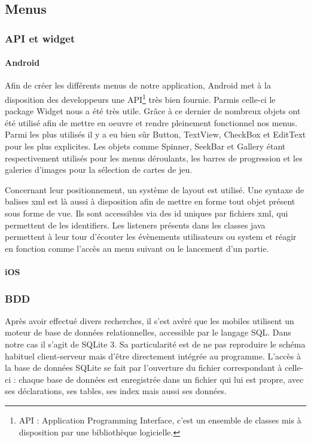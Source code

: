 \subsection{Menus}
	\subsubsection{API et widget}
	\paragraph{Android\\}
		Afin de créer les différents menus de notre application, Android met à la
		disposition des developpeurs une API\footnote{API : Application Programming
		Interface, c'est un ensemble de classes mis à disposition par une
		bibliothèque logicielle.} très bien fournie. Parmis celle-ci le package Widget
		nous a été très utile. Grâce à ce dernier de nombreux objets ont été utilisé
		afin de mettre en oeuvre et rendre pleinement fonctionnel nos menus.
		Parmi les plus utilisés il y a eu bien sûr Button, TextView, CheckBox et
		EditText pour les plus explicites. Les objets comme Spinner, SeekBar et
		Gallery étant respectivement utilisés pour les menus déroulants, les barres de
		progression et les galeries d'images pour la sélection de cartes de jeu.
		
		Concernant leur positionnement, un système de layout est utilisé. Une syntaxe
		de balises xml est là aussi à disposition afin de mettre en forme tout objet
		présent sous forme de vue. Ils sont accessibles via des id uniques par
		fichiers xml, qui permettent de les identifiers. Les listeners présents dans
		les classes java permettent à leur tour d'écouter les évènements utilisateurs
		ou system et réagir en fonction comme l'accès au menu suivant ou le lancement
		d'un partie.
	\paragraph{iOS\\}
		
	\subsubsection{BDD}

		Après avoir effectué divers recherches, il s'est avéré que les mobiles
		utilisent un moteur de base de données relationnelles, accessible par le
		langage SQL. Dans notre cas il s'agit de SQLite 3. Sa particularité est de ne
		pas reproduire le schéma habituel client-serveur mais d'être directement intégrée au programme.
		L'accès à la base de données SQLite se fait par l'ouverture du fichier
		correspondant à celle-ci : chaque base de données est enregistrée dans un fichier qui lui est propre,
		 avec ses déclarations, ses tables, ses index mais aussi ses données.
			
